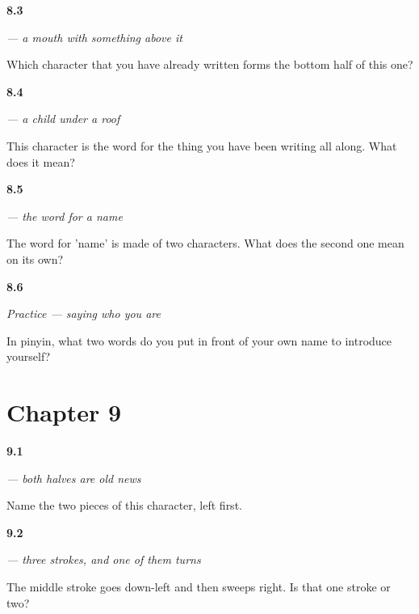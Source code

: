 \noindent\begin{minipage}[t]{\linewidth}
\raggedright
\hypertarget{review-ZH-W08-ming-lower}{\textbf{8.3}} \emph{ — a mouth with something above it}\par
\small Which character that you have already written forms the bottom half of this one?
\end{minipage}\par\medskip

\noindent\begin{minipage}[t]{\linewidth}
\raggedright
\hypertarget{review-ZH-W08-zi-meaning}{\textbf{8.4}} \emph{ — a child under a roof}\par
\small This character is the word for the thing you have been writing all along. What does it mean?
\end{minipage}\par\medskip

\noindent\begin{minipage}[t]{\linewidth}
\raggedright
\hypertarget{review-ZH-C08-mingzi-parts}{\textbf{8.5}} \emph{ — the word for a name}\par
\small The word for 'name' is made of two characters. What does the second one mean on its own?
\end{minipage}\par\medskip

\noindent\begin{minipage}[t]{\linewidth}
\raggedright
\hypertarget{review-ZH-C08-practice-self}{\textbf{8.6}} \emph{Practice — saying who you are}\par
\small In pinyin, what two words do you put in front of your own name to introduce yourself?
\end{minipage}\par\medskip

\section*{Chapter 9}

\noindent\begin{minipage}[t]{\linewidth}
\raggedright
\hypertarget{review-ZH-W09-shen-halves}{\textbf{9.1}} \emph{ — both halves are old news}\par
\small Name the two pieces of this character, left first.
\end{minipage}\par\medskip

\noindent\begin{minipage}[t]{\linewidth}
\raggedright
\hypertarget{review-ZH-W09-me-turn}{\textbf{9.2}} \emph{ — three strokes, and one of them turns}\par
\small The middle stroke goes down-left and then sweeps right. Is that one stroke or two?
\end{minipage}\par\medskip


